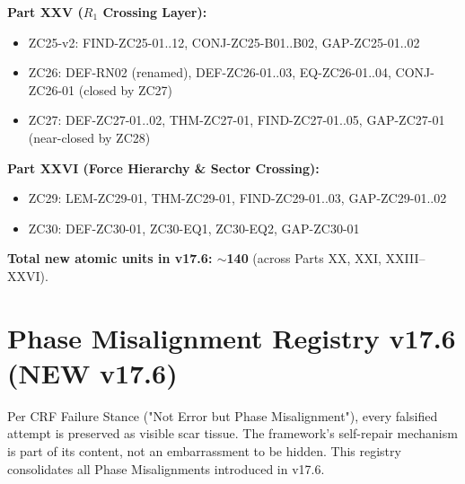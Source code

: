 \documentclass[12pt, a4paper]{article}
\begin{document}
\textbf{Part XXV ($R_1$ Crossing Layer):}
\begin{itemize}[leftmargin=*, noitemsep]
\item ZC25-v2: FIND-ZC25-01..12, CONJ-ZC25-B01..B02, GAP-ZC25-01..02
\item ZC26: DEF-RN02 (renamed), DEF-ZC26-01..03, EQ-ZC26-01..04,
  CONJ-ZC26-01 (closed by ZC27)
\item ZC27: DEF-ZC27-01..02, THM-ZC27-01, FIND-ZC27-01..05, GAP-ZC27-01
  (near-closed by ZC28)
\end{itemize}

\textbf{Part XXVI (Force Hierarchy \& Sector Crossing):}
\begin{itemize}[leftmargin=*, noitemsep]
\item ZC29: LEM-ZC29-01, THM-ZC29-01, FIND-ZC29-01..03, GAP-ZC29-01..02
\item ZC30: DEF-ZC30-01, ZC30-EQ1, ZC30-EQ2, GAP-ZC30-01
\end{itemize}

\textbf{Total new atomic units in v17.6: $\sim$140} (across Parts XX,
XXI, XXIII--XXVI).

\section{Phase Misalignment Registry v17.6 (NEW v17.6)}
\label{sec:pm-registry-v176}

Per CRF Failure Stance ("Not Error but Phase Misalignment"), every
falsified attempt is preserved as visible scar tissue. The framework's
self-repair mechanism is part of its content, not an embarrassment to
be hidden. This registry consolidates all Phase Misalignments
introduced in v17.6.
\end{document}
